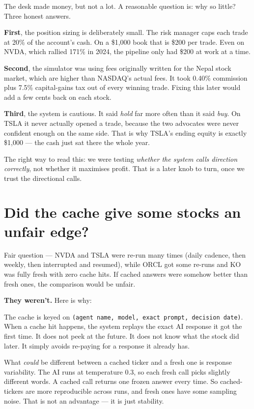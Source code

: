 \documentclass[11pt,a4paper]{article}
\begin{document}
The desk made money, but not a lot. A reasonable question is: why so little?
Three honest answers.

\textbf{First}, the position sizing is deliberately small. The risk manager
caps each trade at 20\% of the account's cash. On a \$1{,}000 book that is
\$200 per trade. Even on NVDA, which rallied 171\% in 2024, the pipeline
only had \$200 at work at a time.

\textbf{Second}, the simulator was using fees originally written for the
Nepal stock market, which are higher than NASDAQ's actual fees. It took
0.40\% commission plus 7.5\% capital-gains tax out of every winning trade.
Fixing this later would add a few cents back on each stock.

\textbf{Third}, the system is cautious. It said \textit{hold} far more
often than it said \textit{buy}. On TSLA it never actually opened a trade,
because the two advocates were never confident enough on the same side.
That is why TSLA's ending equity is exactly \$1{,}000 --- the cash just
sat there the whole year.

The right way to read this: we were testing \textit{whether the system
calls direction correctly}, not whether it maximises profit. That is a
later knob to turn, once we trust the directional calls.

\section{Did the cache give some stocks an unfair edge?}

Fair question --- NVDA and TSLA were re-run many times (daily cadence, then
weekly, then interrupted and resumed), while ORCL got some re-runs and KO
was fully fresh with zero cache hits. If cached answers were somehow better
than fresh ones, the comparison would be unfair.

\textbf{They weren't.} Here is why:

The cache is keyed on \texttt{(agent name, model, exact prompt, decision
date)}. When a cache hit happens, the system replays the exact AI response
it got the first time. It does not peek at the future. It does not know
what the stock did later. It simply avoids re-paying for a response it
already has.

What \textit{could} be different between a cached ticker and a fresh one
is response variability. The AI runs at temperature 0.3, so each fresh
call picks slightly different words. A cached call returns one frozen
answer every time. So cached-tickers are more reproducible across runs,
and fresh ones have some sampling noise. That is not an advantage --- it
is just stability.
\end{document}
